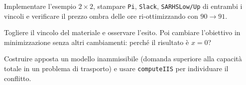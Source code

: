 \begin{esercizio}
Implementare l'esempio $2\times2$, stampare \texttt{Pi}, \texttt{Slack},
\texttt{SARHSLow/Up} di entrambi i vincoli e verificare il prezzo ombra delle ore
ri-ottimizzando con $90 \to 91$.
\end{esercizio}

\begin{esercizio}
Togliere il vincolo del materiale e osservare l'esito. Poi cambiare l'obiettivo in
minimizzazione senza altri cambiamenti: perché il risultato è $x = 0$?
\end{esercizio}

\begin{esercizio}
Costruire apposta un modello inammissibile (domanda superiore alla capacità totale in
un problema di trasporto) e usare \texttt{computeIIS} per individuare il conflitto.
\end{esercizio}
